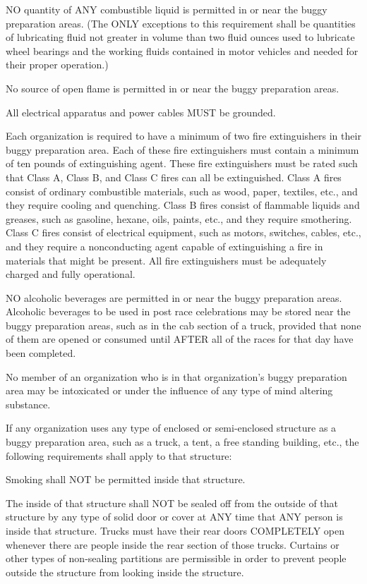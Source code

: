 	NO quantity of ANY combustible liquid is permitted in or near the buggy
	preparation areas. (The ONLY exceptions to this requirement shall be quantities
	of lubricating fluid not greater in volume than two fluid ounces used to
	lubricate wheel bearings and the working fluids contained in motor vehicles and
	needed for their proper operation.)

	No source of open flame is permitted in or near the buggy preparation areas.

	All electrical apparatus and power cables MUST be grounded.

	Each organization is required to have a minimum of two fire extinguishers in
	their buggy preparation area. Each of these fire extinguishers must contain a
	minimum of ten pounds of extinguishing agent. These fire extinguishers must be
	rated such that Class A, Class B, and Class C fires can all be extinguished.
	Class A fires consist of ordinary combustible materials, such as wood, paper,
	textiles, etc., and they require cooling and quenching. Class B fires consist
	of flammable liquids and greases, such as gasoline, hexane, oils, paints, etc.,
	and they require smothering. Class C fires consist of electrical equipment,
	such as motors, switches, cables, etc., and they require a nonconducting agent
	capable of extinguishing a fire in materials that might be present. All fire
	extinguishers must be adequately charged and fully operational.

	NO alcoholic beverages are permitted in or near the buggy preparation areas.
	Alcoholic beverages to be used in post race celebrations may be stored near the
	buggy preparation areas, such as in the cab section of a truck, provided that
	none of them are opened or consumed until AFTER all of the races for that day
	have been completed.

	No member of an organization who is in that organization's buggy preparation
	area may be intoxicated or under the influence of any type of mind altering
	substance.

	If any organization uses any type of enclosed or semi-enclosed structure as a
	buggy preparation area, such as a truck, a tent, a free standing building,
	etc., the following requirements shall apply to that structure:

	Smoking shall NOT be permitted inside that structure.

	The inside of that structure shall NOT be sealed off from the outside of that
	structure by any type of solid door or cover at ANY time that ANY person is
	inside that structure. Trucks must have their rear doors COMPLETELY open
	whenever there are people inside the rear section of those trucks. Curtains or
	other types of non-sealing partitions are permissible in order to prevent
	people outside the structure from looking inside the structure.

